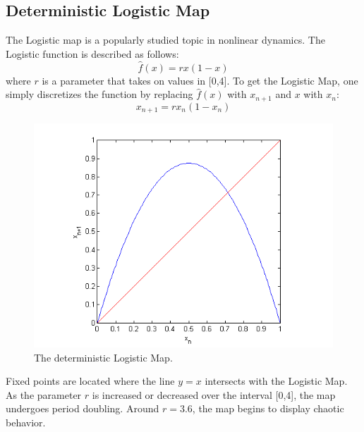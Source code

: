 \documentclass[12pt]{article}
\begin{document}
\subsection{Deterministic Logistic Map}
The Logistic map is a popularly studied topic in nonlinear
dynamics. The Logistic function is described as follows:
\begin{equation}\label{orig}
\hat{f}(x) = rx(1-x)
\end{equation}
where $r$ is a parameter that takes on values in [0,4]. To get the
Logistic Map, one simply discretizes the function by replacing
$\hat{f}(x)$ with $x_{n+1}$ and $x$ with $x_n$:
\begin{equation*}
x_{n+1}=rx_n(1-x_n)
\end{equation*}
\begin{figure}[H]
	\begin{center}
		\includegraphics[scale=0.7]{deterministic}
\caption{The deterministic Logistic Map.}
	\end{center}
\end{figure}
Fixed points are located where the line $y=x$ intersects with the
Logistic Map. As the parameter $r$ is increased or decreased over the
interval [0,4], the map undergoes period doubling. Around $r=3.6$, the
map begins to display chaotic behavior.
\end{document}
